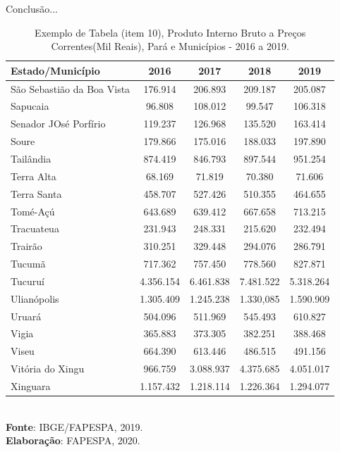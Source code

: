 \newpage
\begin{table}[!htb]
    \centering
    {
    \caption{Exemplo de Tabela (item 10), Produto Interno Bruto a Preços Correntes(Mil Reais), Pará e Municípios - 2016 a 2019.}  Conclusão...
    \label{item 10 regras5}
\begin{tabular}{l|c|c|c|c}
  \hline\hline
  Estado/Município            &    2016    &  2017   &  2018       &  2019    \\
  \hline\hline
   São Sebastião da Boa Vista &  176.914   &  206.893  & 209.187   & 205.087  \\
   Sapucaia                   &  96.808    & 108.012   & 99.547    & 106.318  \\
   Senador JOsé Porfírio      &  119.237   & 126.968   & 135.520   & 163.414  \\ 
   Soure                      &  179.866   & 175.016   & 188.033   & 197.890  \\
   Tailândia                  & 874.419    & 846.793   & 897.544   & 951.254  \\
   Terra Alta                 &  68.169    & 71.819    & 70.380    & 71.606  \\
   Terra Santa                &  458.707   & 527.426   & 510.355   & 464.655 \\
   Tomé-Açú                   &  643.689   & 639.412   & 667.658   & 713.215 \\
   Tracuateua                 &  231.943   & 248.331   & 215.620   & 232.494 \\
   Trairão                    &  310.251   & 329.448   & 294.076   & 286.791 \\
   Tucumã                     &  717.362   & 757.450     & 778.560   & 827.871 \\
   Tucuruí                    &  4.356.154 & 6.461.838   & 7.481.522 & 5.318.264 \\
   Ulianópolis                &  1.305.409 & 1.245.238   & 1.330,085 & 1.590.909 \\
   Uruará                     &  504.096   & 511.969     & 545.493   & 610.827  \\
   Vigia                      &  365.883   & 373.305     & 382.251   & 388.468 \\
   Viseu                      &  664.390   & 613.446     & 486.515   &  491.156 \\
   Vitória do Xingu           & 966.759    &  3.088.937  & 4.375.685 &  4.051.017  \\
   Xinguara                   & 1.157.432  & 1.218.114   & 1.226.364 & 1.294.077 \\
   \hline\hline
\end{tabular}}
\\
\hspace{-7.5cm}
\textbf{Fonte}: IBGE/FAPESPA, 2019. \\
\hspace{-7.5cm}
\textbf{Elaboração}: FAPESPA, 2020.
\end{table}







